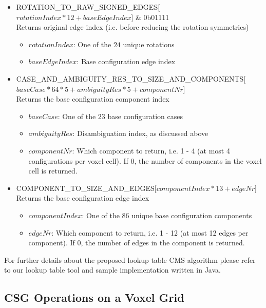 \begin{itemize}
	\item ROTATION\_TO\_RAW\_SIGNED\_EDGES[$rotationIndex * 12 + baseEdgeIndex$] \& 0b01111\\
	Returns original edge index (i.e. before reducing the rotation symmetries)
	\begin{itemize}
		\item $rotationIndex$: One of the $24$ unique rotations
		\item $baseEdgeIndex$: Base configuration edge index
  \end{itemize}
	
	\item CASE\_AND\_AMBIGUITY\_RES\_TO\_SIZE\_AND\_COMPONENTS[$baseCase * 64 * 5 + ambiguityRes * 5 + componentNr$]\\
	Returns the base configuration component index
	\begin{itemize}
		\item $baseCase$: One of the $23$ base configuration cases
		\item $ambiguityRes$: Disambiguation index, as discussed above
		\item $componentNr$: Which component to return, i.e. 1 - 4 (at most 4 configurations per voxel cell). If 0, the number of components in
		the voxel cell is returned.
  \end{itemize}

	\item COMPONENT\_TO\_SIZE\_AND\_EDGES[$componentIndex * 13 + edgeNr$]\\
	Returns the base configuration edge index
	\begin{itemize}
		\item $componentIndex$: One of the $86$ unique base configuration components
		\item $edgeNr$: Which component to return, i.e. 1 - 12 (at most 12 edges per component). If 0, the number of edges in
		the component is returned.
  \end{itemize}
	
\end{itemize}

For further details about the proposed lookup table CMS algorithm please refer to our lookup table tool and sample implementation written in Java.


\subsection{CSG Operations on a Voxel Grid}

